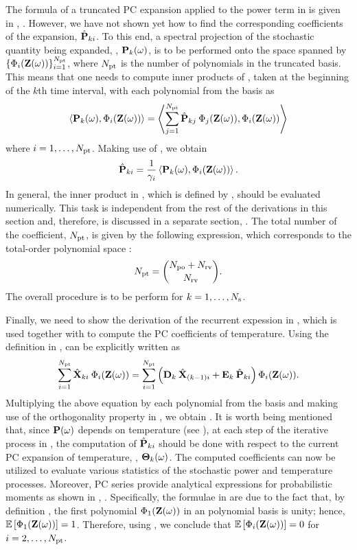 The formula of a truncated PC expansion applied to the power term in  is given in , . However, we have not shown yet how to find the corresponding coefficients of the expansion, $\hat{\mathbf{P}}_{ki}$. To this end, a spectral projection of the stochastic quantity being expanded, \ie, $\mathbf{P}_k(\omega)$, is to be performed onto the space spanned by $\{ \Phi_i(\mathbf{Z}(\omega)) \}_{i = 1}^{{N_\text{pt}}}$, where ${N_\text{pt}}$ is the number of polynomials in the truncated basis. This means that one needs to compute inner products of , taken at the beginning of the $k$th time interval, with each polynomial from the basis as
\[
  \oInner{\vP_k(\o)}{\pcb_i(\vZ(\o))} = \oInner{\sum_{j=1}^{\pcterms} \pcc{\vP}_{kj} \: \pcb_j(\vZ(\o))}{\pcb_i(\vZ(\o))}
\]
where $i = 1, \dotsc, {N_\text{pt}}$. Making use of , we obtain
\begin{equation} \elabel{pc-coefficients}
  \pcc{\vP}_{ki} = \frac{1}{\pcn_i} \oInner{\vP_k(\o)}{\pcb_i(\vZ(\o))}.
\end{equation}
In general, the inner product in , which is defined by , should be evaluated numerically. This task is independent from the rest of the derivations in this section and, therefore, is discussed in a separate section, . The total number of the coefficient, ${N_\text{pt}}$, is given by the following expression, which corresponds to the total-order polynomial space \cite{beck2011}:
\begin{equation} \elabel{pc-terms}
  \pcterms = { \pcorder + \vars \choose \vars }.
\end{equation}
The overall procedure is to be perform for $k = 1, \dotsc, N_\text{s}$.

Finally, we need to show the derivation of the recurrent expession in , which is used together with  to compute the PC coefficients of temperature. Using the definition in ,  can be explicitly written as
\[
  \sum_{i = 1}^{\pcterms} \pcc{\vX}_{ki} \: \pcb_i(\vZ(\o)) = \sum_{i = 1}^{\pcterms} \left( \mCF_k \: \pcc{\vX}_{(k - 1)i} + \mCS_k \: \pcc{\vP}_{ki} \right) \pcb_i(\vZ(\o)).
\]
Multiplying the above equation by each polynomial from the basis and making use of the orthogonality property in , we obtain . It is worth being mentioned that, since $\mathbf{P}(\omega)$ depends on temperature (see ), at each step of the iterative process in , the computation of $\hat{\mathbf{P}}_{ki}$ should be done with respect to the current PC expansion of temperature, \ie, ${\boldsymbol\Theta}_k(\omega)$. The computed coefficients can now be utilized to evaluate various statistics of the stochastic power and temperature processes. Moreover, PC series provide analytical expressions for probabilistic moments as shown in , . Specifically, the formulae in  are due to the fact that, by definition \cite{xiu2010}, the first polynomial $\Phi_1(\mathbf{Z}(\omega))$ in an polynomial basis is unity; hence, $\mathbb{E}\left[\Phi_1(\mathbf{Z}(\omega))\right] = 1$. Therefore, using , we conclude that $\mathbb{E}\left[\Phi_i(\mathbf{Z}(\omega))\right] = 0$ for $i = 2, \dotsc, {N_\text{pt}}$.

